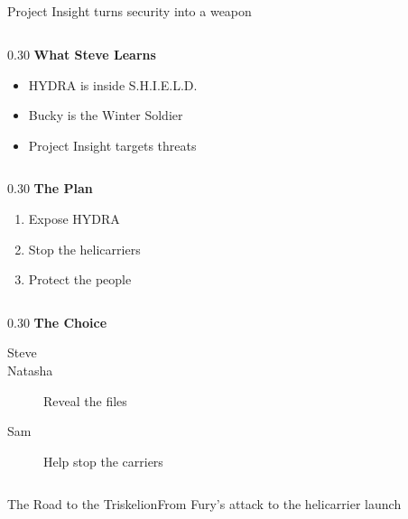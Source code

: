 \subsection{\decisionstitle}
\begin{frame}{\decisionstitle}{Project Insight turns security into a weapon}
    \begin{SlideThreeColumns}
        \begin{column}{0.30\textwidth}
            \textbf{What Steve Learns}
            \begin{itemize}
                \item HYDRA is inside S.H.I.E.L.D.
                \item Bucky is the Winter Soldier
                \item Project Insight targets threats
            \end{itemize}
        \end{column}
        \begin{column}{0.30\textwidth}
            \textbf{The Plan}
            \begin{enumerate}
                \item Expose HYDRA
                \item Stop the helicarriers
                \item Protect the people
            \end{enumerate}
        \end{column}
        \begin{column}{0.30\textwidth}
            \textbf{The Choice}
            \begin{description}
                \item[Steve] 
                \item[Natasha] Reveal the files
                \item[Sam] Help stop the carriers
            \end{description}
        \end{column}
    \end{SlideThreeColumns}
\end{frame}

\begin{frame}{The Road to the Triskelion}{From Fury's attack to the helicarrier launch}
    \SlideTimeline
\end{frame}


